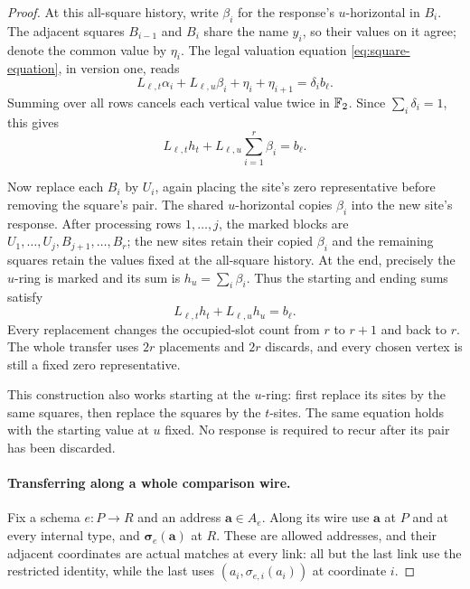 \begin{proof}
At this all-square history, write $\beta_i$ for the response's
$u$-horizontal in $B_i$.  The adjacent squares $B_{i-1}$ and $B_i$ share
the name $y_i$, so their values on it agree; denote the common value by
$\eta_i$.  The legal valuation equation
\eqref{eq:square-equation}, in version one, reads
\[
 L_{\ell,t}\alpha_i+L_{\ell,u}\beta_i+\eta_i+\eta_{i+1}
   =\delta_i b_\ell.
\]
Summing over all rows cancels each vertical value twice in $\mathbb F_2$.  Since
$\sum_i\delta_i=1$, this gives
\begin{equation}
\label{uniform:transfer-sum}
 L_{\ell,t}h_t+L_{\ell,u}\sum_{i=1}^r\beta_i=b_\ell.
\end{equation}



Now replace each $B_i$ by $U_i$, again placing the site's zero
representative before removing the square's pair.  The shared
$u$-horizontal copies $\beta_i$ into the new site's response.  After
processing rows $1,\ldots,j$, the marked blocks are
$U_1,\ldots,U_j,B_{j+1},\ldots,B_r$; the new sites retain their copied
$\beta_i$ and the remaining squares retain the values fixed at the
all-square history.  At the end, precisely the $u$-ring is marked and its
sum is $h_u=\sum_i\beta_i$.  Thus the starting and ending sums satisfy
\begin{equation}
\label{uniform:attained-link}
 L_{\ell,t}h_t+L_{\ell,u}h_u=b_\ell.
\end{equation}
Every replacement changes the occupied-slot count from $r$ to $r+1$ and
back to $r$.  The whole transfer uses $2r$ placements and $2r$ discards,
and every chosen vertex is still a fixed zero representative.

This construction also works starting at the $u$-ring: first replace its
sites by the same squares, then replace the squares by the $t$-sites.
The same equation holds with the starting value at $u$ fixed.  No response
is required to recur after its pair has been discarded.

\paragraph{Transferring along a whole comparison wire.}
Fix a schema $e:P\to R$ and an address $\mathbf a\in A_e$.  Along its
wire use $\mathbf a$ at $P$ and at every internal type, and
$\boldsymbol\sigma_e(\mathbf a)$ at $R$.  These are allowed addresses,
and their adjacent coordinates are actual matches at every link: all
but the last link use the restricted identity, while the last uses
$(a_i,\sigma_{e,i}(a_i))$ at coordinate $i$.


\end{proof}
